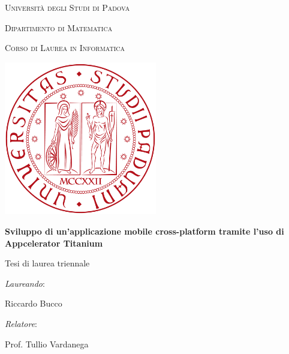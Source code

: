 \begin{titlepage}
	\thispagestyle{first_page_style}
	\centering
	\LARGE{\textsc{Università degli Studi di Padova}\par}
	\vspace{4mm}
	\large{\textsc{Dipartimento di Matematica}\par}
	\vspace{1mm}
	\large{\textsc{Corso di Laurea in Informatica}\par}
	\vspace{15mm}
	\includegraphics[width=0.5\textwidth]{copertina/immagini/logo_unipd.png}\par
	\vspace{20mm}
	\huge{\textbf{Sviluppo di un'applicazione mobile cross-platform tramite l'uso di Appcelerator Titanium}\par}
	\vspace{10mm}
	\large{Tesi di laurea triennale\par}
	\vfill
	\begin{minipage}{\textwidth}
		\begin{minipage}{0.49\textwidth}
			\raggedright
			\large{\textit{Laureando}:\par}
			\large{Riccardo Bucco}
		\end{minipage}
		\begin{minipage}{0.49\textwidth}
			\raggedleft
			\large{\textit{Relatore}:\par}
			\large{Prof. Tullio Vardanega\par}
		\end{minipage}\par
	\end{minipage}
	\vspace{7mm}
	\restoregeometry
\end{titlepage}
